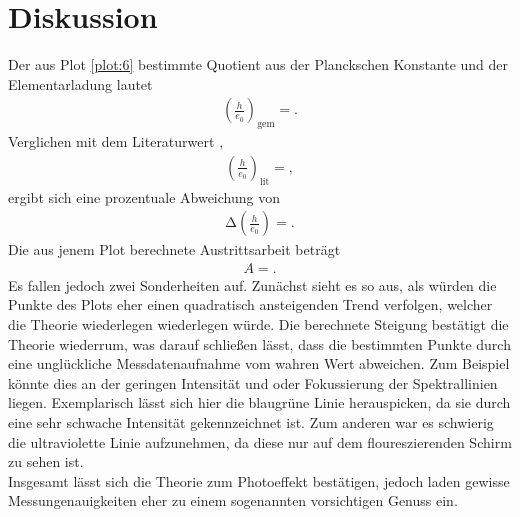 \section{Diskussion}
\label{sec:Diskussion}



Der aus Plot \ref{plot:6} bestimmte Quotient aus der Planckschen Konstante und der Elementarladung lautet
\begin{align*}
  \left(\frac{h}{e_0}\right)_{\text{gem}} = .
\end{align*}
Verglichen mit dem Literaturwert \cite{Konstanten},
\begin{align*}
  \left(\frac{h}{e_0}\right)_{\text{lit}} = ,
\end{align*}
ergibt sich eine prozentuale Abweichung von
\begin{align*}
  \increment{\left(\frac{h}{e_0}\right)} = .
\end{align*}
Die aus jenem Plot berechnete Austrittsarbeit beträgt
\begin{align*}
  A = .
\end{align*}
Es fallen jedoch zwei Sonderheiten auf.
Zunächst sieht es so aus, als würden die Punkte des Plots eher einen quadratisch ansteigenden Trend verfolgen, welcher die Theorie wiederlegen wiederlegen würde.
Die berechnete Steigung bestätigt die Theorie wiederrum, was darauf schließen lässt, dass die bestimmten Punkte durch eine unglückliche Messdatenaufnahme vom wahren Wert abweichen.
Zum Beispiel könnte dies an der geringen Intensität und oder Fokussierung der Spektrallinien liegen. Exemplarisch lässt sich hier die blaugrüne Linie herauspicken, da sie durch eine sehr schwache Intensität gekennzeichnet ist.
Zum anderen war es schwierig die ultraviolette Linie aufzunehmen, da diese nur auf dem floureszierenden Schirm zu sehen ist.\\
Insgesamt lässt sich die Theorie zum Photoeffekt bestätigen, jedoch laden gewisse Messungenauigkeiten eher zu einem sogenannten vorsichtigen Genuss ein.
